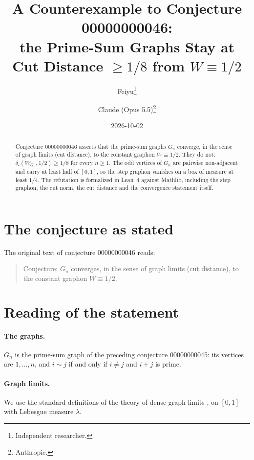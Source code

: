 \documentclass[11pt]{article}
\title{A Counterexample to Conjecture 00000000046:\\
the Prime-Sum Graphs Stay at Cut Distance $\ge 1/8$ from $W\equiv1/2$}
\author{%
  Feiyu\thanks{Independent researcher.}
  \and
  Claude (Opus 5.5)\thanks{Anthropic.}%
}
\date{2026-10-02}
\theoremstyle{plain}
\theoremstyle{definition}
\theoremstyle{remark}
\newcommand{\dcut}{\delta_\square}
\begin{document}
\maketitle

\begin{abstract}
Conjecture 00000000046 asserts that the prime-sum graphs $G_n$ converge, in the
sense of graph limits (cut distance), to the constant graphon $W\equiv1/2$. They
do not: $\dcut(W_{G_n},1/2)\ge1/8$ for every $n\ge1$. The odd vertices of $G_n$
are pairwise non-adjacent and carry at least half of $[0,1]$, so the step
graphon vanishes on a box of measure at least $1/4$. The refutation is
formalized in Lean~4 against Mathlib, including the step graphon, the cut norm,
the cut distance and the convergence statement itself.
\end{abstract}

\section{The conjecture as stated}

The original text of conjecture 00000000046 reads:

\begin{quote}
Conjecture: $G_n$ converges, in the sense of graph limits (cut distance), to the
constant graphon $W \equiv 1/2$.
\end{quote}

\section{Reading of the statement}

\paragraph{The graphs.} $G_n$ is the prime-sum graph of the preceding
conjecture 00000000045: its vertices are $1,\ldots,n$, and $i\sim j$ if and
only if $i\ne j$ and $i+j$ is prime.

\paragraph{Graph limits.} We use the standard definitions of the theory of
dense graph limits \cite{lovasz}, on $[0,1]$ with Lebesgue measure $\lambda$.
\end{document}
